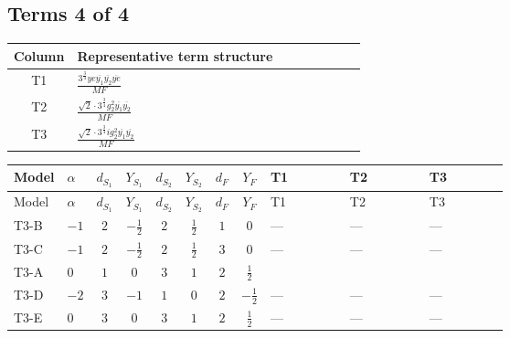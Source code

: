 \documentclass[8pt]{article}
\begin{document}
\begin{landscape}
\subsection*{Terms 4 of 4}
\begin{center}
\begin{tabular}{@{}c >{\raggedright\arraybackslash}p{0.82\linewidth}@{}}
\toprule
Column & Representative term structure \\
\midrule
T1 & \(\displaystyle \frac{3^{\frac{3}{4}} ye \overline{y_{1}} \overline{y_{2}} \overline{ye}}{MF}\) \\
\midrule
T2 & \(\displaystyle \frac{\sqrt{2} \cdot 3^{\frac{3}{4}} g_{2}^{2} \overline{y_{1}} \overline{y_{2}}}{MF}\) \\
\midrule
T3 & \(\displaystyle \frac{\sqrt{2} \cdot 3^{\frac{3}{4}} i g_{2}^{2} \overline{y_{1}} \overline{y_{2}}}{MF}\) \\
\midrule
\bottomrule
\end{tabular}
\end{center}
\smallskip
\tiny
\begin{longtable}{@{}llcccccc >{\raggedright\arraybackslash}p{0.21\linewidth} >{\raggedright\arraybackslash}p{0.21\linewidth} >{\raggedright\arraybackslash}p{0.21\linewidth}@{}}
\toprule
Model & $\alpha$ & $d_{S_1}$ & $Y_{S_1}$ & $d_{S_2}$ & $Y_{S_2}$ & $d_F$ & $Y_F$ & T1 & T2 & T3 \\
\midrule
\endfirsthead
\toprule
Model & $\alpha$ & $d_{S_1}$ & $Y_{S_1}$ & $d_{S_2}$ & $Y_{S_2}$ & $d_F$ & $Y_F$ & T1 & T2 & T3 \\
\midrule
\endhead
T3-B & $-1$ & $2$ & $-\frac{1}{2}$ & $2$ & $\frac{1}{2}$ & $1$ & $0$ & --- & --- & --- \\
\midrule
T3-C & $-1$ & $2$ & $-\frac{1}{2}$ & $2$ & $\frac{1}{2}$ & $3$ & $0$ & --- & --- & --- \\
\midrule
T3-A & $0$ & $1$ & $0$ & $3$ & $1$ & $2$ & $\frac{1}{2}$ & \scriptsize\adjustbox{max width=\linewidth}{$\begin{gathered} - \frac{3^{\frac{3}{4}} ye \overline{y_{1}} \overline{y_{2}} \overline{ye}}{12 MF}\end{gathered}$} & \scriptsize\adjustbox{max width=\linewidth}{$\begin{gathered} \frac{\sqrt{2} \cdot 3^{\frac{3}{4}} g_{2}^{2} \overline{y_{1}} \overline{y_{2}}}{6 MF}\end{gathered}$} & \scriptsize\adjustbox{max width=\linewidth}{$\begin{gathered} - \frac{\sqrt{2} \cdot 3^{\frac{3}{4}} i g_{2}^{2} \overline{y_{1}} \overline{y_{2}}}{6 MF}\end{gathered}$} \\
\midrule
T3-D & $-2$ & $3$ & $-1$ & $1$ & $0$ & $2$ & $-\frac{1}{2}$ & --- & --- & --- \\
\midrule
T3-E & $0$ & $3$ & $0$ & $3$ & $1$ & $2$ & $\frac{1}{2}$ & --- & --- & --- \\
\midrule
\bottomrule
\end{longtable}
\clearpage

\end{landscape}
\end{document}
